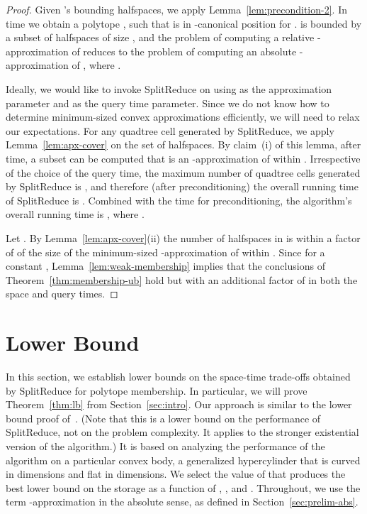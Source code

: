 \documentclass[11pt]{article}   \usepackage[letterpaper,hmargin=2.1cm,vmargin=3cm]{geometry}
\newcommand{\alg}{\textrm{SplitReduce}}
\begin{document}
\begin{proof}
Given 's bounding halfspaces, we apply Lemma~\ref{lem:precondition-2}. In  time we obtain a polytope , such that  is in -canonical position for .  is bounded by a subset  of halfspaces of size , and the problem of computing a relative -approximation of  reduces to the problem of computing an absolute -approximation of , where . 

Ideally, we would like to invoke {\alg} on  using  as the approximation parameter and  as the query time parameter. Since we do not know how to determine minimum-sized convex approximations efficiently, we will need to relax our expectations. For any quadtree cell  generated by {\alg}, we apply Lemma~\ref{lem:apx-cover} on the set  of halfspaces. By claim~(i) of this lemma, after  time, a subset  can be computed that is an -approximation of  within . Irrespective of the choice of the query time, the maximum number of quadtree cells generated by {\alg} is , and therefore (after preconditioning) the overall running time of {\alg} is . Combined with the  time for preconditioning, the algorithm's overall running time is , where .

Let . By Lemma~\ref{lem:apx-cover}(ii) the number of halfspaces in  is within a factor of  of the size of the minimum-sized -approximation of  within . Since  for a constant , Lemma~\ref{lem:weak-membership} implies that the conclusions of Theorem~\ref{thm:membership-ub} hold but with an additional factor of  in both the space and query times.
\end{proof}

\section{Lower Bound} \label{sec:lb}


In this section, we establish lower bounds on the space-time trade-offs obtained by {\alg} for polytope membership. In particular, we will prove Theorem~\ref{thm:lb} from Section~\ref{sec:intro}. Our approach is similar to the lower bound proof of~\cite{AVD-JACM}. (Note that this is a lower bound on the performance of {\alg}, not on the problem complexity. It applies to the stronger existential version of the algorithm.) It is based on analyzing the performance of the algorithm on a particular convex body, a generalized hypercylinder that is curved in  dimensions and flat in  dimensions. We select the value of  that produces the best lower bound on the storage as a function of , , and . Throughout, we use the term -approximation in the absolute sense, as defined in Section~\ref{sec:prelim-abs}. 
\end{document}
